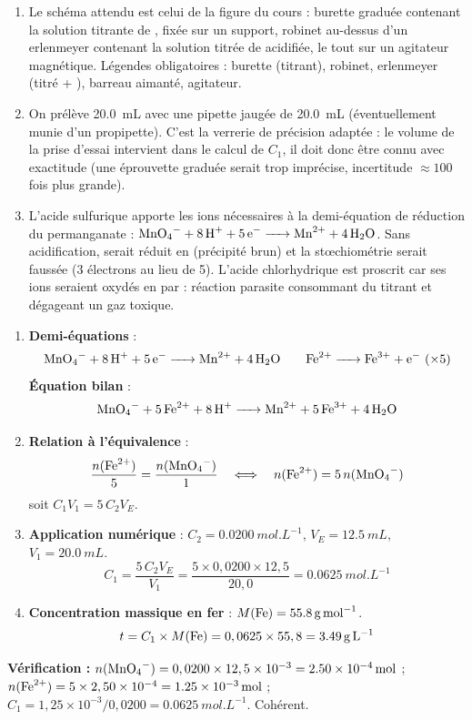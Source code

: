 \documentclass[11pt]{article}
\newcommand{\cle}[1]{{\popxbold\color{popdark}#1}}
\begin{document}
\begin{corrige}
\begin{enumerate}
\item Le schéma attendu est celui de la figure du cours : burette graduée contenant la solution titrante de , fixée sur un support, robinet au-dessus d'un erlenmeyer contenant la solution titrée de  acidifiée, le tout sur un agitateur magnétique. Légendes obligatoires : burette (titrant), robinet, erlenmeyer (titré + ), barreau aimanté, agitateur.
\item On prélève \SI{20,0}{mL} avec une \cle{pipette jaugée} de \SI{20,0}{mL} (éventuellement munie d'un propipette). C'est la verrerie de précision adaptée : le volume de la prise d'essai intervient dans le calcul de $C_1$, il doit donc être connu avec exactitude (une éprouvette graduée serait trop imprécise, incertitude $\approx 100$ fois plus grande).
\item L'acide sulfurique apporte les ions  nécessaires à la demi-équation de réduction du permanganate : $\ce{MnO4- + 8H+ + 5e- -> Mn^2+ + 4H2O}$. Sans acidification,  serait réduit en  (précipité brun) et la stœchiométrie serait faussée (3 électrons au lieu de 5). L'acide chlorhydrique est proscrit car ses ions  seraient oxydés en  par  : réaction parasite consommant du titrant et dégageant un gaz toxique.
\end{enumerate}
\end{corrige}

\begin{corrige}
\begin{enumerate}
\item \textbf{Demi-équations} :
\[ \ce{MnO4- + 8H+ + 5e- -> Mn^2+ + 4H2O} \qquad \ce{Fe^2+ -> Fe^3+ + e-} \ (\times 5) \]
\textbf{Équation bilan} :
\[ \ce{MnO4- + 5Fe^2+ + 8H+ -> Mn^2+ + 5Fe^3+ + 4H2O} \]
\item \textbf{Relation à l'équivalence} :
\[ \frac{n(\ce{Fe^2+})}{5} = \frac{n(\ce{MnO4-})}{1} \quad \Longleftrightarrow \quad n(\ce{Fe^2+}) = 5\,n(\ce{MnO4-}) \]
soit $C_1 V_1 = 5\,C_2 V_E$.
\item \textbf{Application numérique} : $C_2 = \SI{0,0200}{mol.L^{-1}}$, $V_E = \SI{12,5}{mL}$, $V_1 = \SI{20,0}{mL}$.
\[ C_1 = \frac{5\,C_2 V_E}{V_1} = \frac{5 \times 0,0200 \times 12,5}{20,0} = \SI{0,0625}{mol.L^{-1}} \]
\item \textbf{Concentration massique en fer} : $M(\ce{Fe}) = \SI{55,8}{g.mol^{-1}}$.
\[ t = C_1 \times M(\ce{Fe}) = 0,0625 \times 55,8 = \SI{3,49}{g.L^{-1}} \]
\end{enumerate}
\textbf{Vérification :} $n(\ce{MnO4-}) = 0,0200 \times 12,5\times10^{-3} = \SI{2,50e-4}{mol}$ ; $n(\ce{Fe^2+}) = 5 \times 2,50\times10^{-4} = \SI{1,25e-3}{mol}$ ; $C_1 = 1,25\times10^{-3}/0,0200 = \SI{0,0625}{mol.L^{-1}}$. Cohérent.
\end{corrige}
\end{document}
